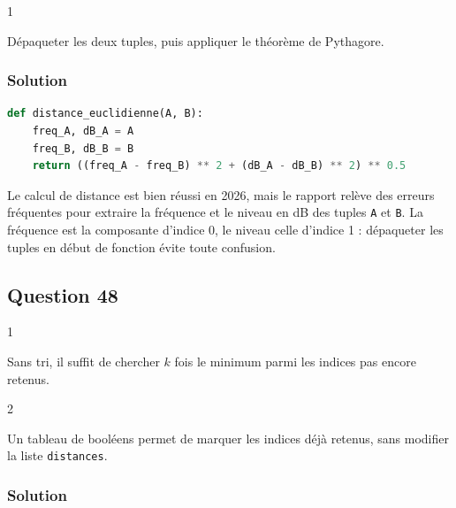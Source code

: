 \documentclass[11pt,a4paper]{article}
\begin{document}
\begin{indication}{1}

Dépaqueter les deux tuples, puis appliquer le théorème de Pythagore.

\end{indication}

\hypertarget{solution-46}{%
\subsubsection{Solution}\label{solution-46}}

\begin{lstlisting}[language=Python]
def distance_euclidienne(A, B):
    freq_A, dB_A = A
    freq_B, dB_B = B
    return ((freq_A - freq_B) ** 2 + (dB_A - dB_B) ** 2) ** 0.5
\end{lstlisting}

\begin{piege}

Le calcul de distance est bien réussi en 2026, mais le rapport relève des erreurs fréquentes pour extraire la fréquence et le niveau en dB des tuples \texttt{A} et \texttt{B}. La fréquence est la composante d'indice 0, le niveau celle d'indice 1 : dépaqueter les tuples en début de fonction évite toute confusion.

\end{piege}

\hypertarget{question-48}{%
\subsection{Question 48}\label{question-48}}

\begin{indication}{1}

Sans tri, il suffit de chercher \(k\) fois le minimum parmi les indices pas encore retenus.

\end{indication}

\begin{indication}{2}

Un tableau de booléens permet de marquer les indices déjà retenus, sans modifier la liste \texttt{distances}.

\end{indication}

\hypertarget{solution-47}{%
\subsubsection{Solution}\label{solution-47}}
\end{document}
